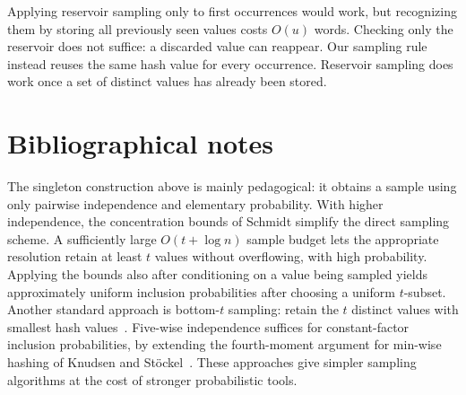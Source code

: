 Applying reservoir sampling only to first occurrences would work, but
recognizing them by storing all previously seen values costs $O(u)$
words. Checking only the reservoir does not suffice: a discarded value
can reappear. Our sampling rule instead reuses the same hash value for
every occurrence. Reservoir sampling does work once a set of distinct
values has already been stored.



\section{Bibliographical notes}

The singleton construction above is mainly pedagogical: it obtains a
sample using only pairwise independence and elementary probability.
With higher independence, the concentration bounds of Schmidt \etal
\cite{sss-chbli-95} simplify the direct sampling scheme.
A sufficiently large $O(t+\log n)$ sample budget lets the appropriate
resolution retain at least $t$ values without overflowing, with high
probability. Applying the bounds also after conditioning on a value
being sampled yields approximately uniform inclusion probabilities
after choosing a uniform $t$-subset. Another standard approach is
bottom-$t$ sampling: retain the $t$ distinct values with smallest hash
values~\cite{t-bkps-13}. Five-wise independence suffices for
constant-factor inclusion probabilities, by extending the fourth-moment
argument for min-wise hashing of Knudsen and St\"ockel~\cite{ks-qlbm-15}.
These approaches give simpler sampling algorithms at the cost of
stronger probabilistic tools.






\nocite{mr-ra-95}

\ChapterEnd{}

